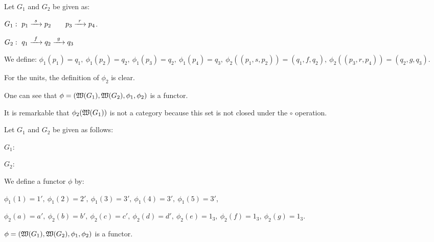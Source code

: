 \bigskip
\begin{example}
Let $G_1$ and $G_2$ be given as:

$G_1:\ p_1 \xrightarrow{\ {s}\ } p_2 \qquad p_3 \xrightarrow{\ {r}\ } p_4$.

$G_2:\ q_1 \xrightarrow{\ {f}\ } q_2 \xrightarrow{\ {g}\ } q_3$

We define: $\phi_1(p_1) = q_1,\ \phi_1(p_2) = q_2,\ \phi_1(p_3) =
q_2,\ \phi_1(p_4) = q_3,\ \phi_2((p_1, s, p_2)) = (q_1, f, q_2),\ \phi_2((p_3,
r, p_4)) = (q_2, g, q_3)$.

For the units, the definition of $\phi_2$ is clear. 

One can see that $\phi = (\mbox{$\mathfrak{W}(G_1)$}, \mbox{$\mathfrak{W}(G_2)$}, \phi_1, \phi_2)$
is a functor.

It is remarkable that $\phi_2(\mbox{$\mathfrak{W}(G_1)$})$ is not a category because this
set is not closed under the $\circ$ operation.
\end{example}

\bigskip
\begin{example}
Let $G_1$ and $G_2$ be given as follows:

$G_1$:
\begin{center}

\end{center}

$G_2$:
\begin{center}

\end{center}

We define a functor $\phi$ by:

$\phi_1(1) = 1',\ \phi_1(2) = 2',\ \phi_1(3) = 3',\ \phi_1(4) = 3',\ \phi_1(5) =
3'$,

$\phi_2(a) = a',\ \phi_2(b) = b',\ \phi_2(c) = c',\ \phi_2(d) = d',\ \phi_2(e) =
1_3,\ \phi_2(f) = 1_3,\ \phi_2(g) = 1_3$.

$\phi = (\mbox{$\mathfrak{W}(G_1)$}, \mbox{$\mathfrak{W}(G_2)$}, \phi_1, \phi_2)$ is a functor.
\end{example}

